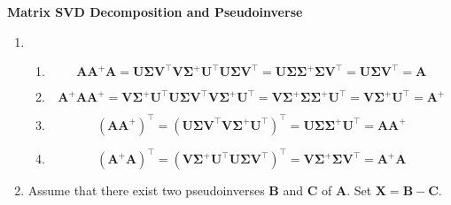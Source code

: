 \documentclass[11pt,letter,notitlepage]{article}
\theoremstyle{definition}
\begin{document}
\newpage

\begin{solution}\textbf{Matrix SVD Decomposition and Pseudoinverse}
	\begin{enumerate}
	\item 
	\begin{enumerate}
		\item 
		\[
		\mathbf{A}\mathbf{A}^{+}\mathbf{A}
		=
		\mathbf{U}\boldsymbol{\Sigma} \mathbf{V}^{\top} \mathbf{V}\boldsymbol{\Sigma}^{+} \mathbf{U}^{\top} \mathbf{U}\boldsymbol{\Sigma} \mathbf{V}^{\top}
		=
		\mathbf{U}\boldsymbol{\Sigma} \boldsymbol{\Sigma}^{+} \boldsymbol{\Sigma} \mathbf{V}^{\top}
		=
		\mathbf{U}\boldsymbol{\Sigma} \mathbf{V}^{\top}
		=
		\mathbf{A}
		\]
		\item 
		\[
		\mathbf{A}^{+}\mathbf{A}\mathbf{A}^{+}
		=
		\mathbf{V}\boldsymbol{\Sigma}^{+} \mathbf{U}^{\top} \mathbf{U}\boldsymbol{\Sigma} \mathbf{V}^{\top} \mathbf{V}\boldsymbol{\Sigma}^{+} \mathbf{U}^{\top}
		=
		\mathbf{V}\boldsymbol{\Sigma}^{+} \boldsymbol{\Sigma} \boldsymbol{\Sigma}^{+} \mathbf{U}^{\top}
		=
		\mathbf{V}\boldsymbol{\Sigma}^{+} \mathbf{U}^{\top}
		=
		\mathbf{A}^{+}
		\]
		\item 
		\[
		(\mathbf{A}\mathbf{A}^{+})^{\top}
		=
		(\mathbf{U}\boldsymbol{\Sigma} \mathbf{V}^{\top} \mathbf{V}\boldsymbol{\Sigma}^{+} \mathbf{U}^{\top})^{\top}
		=
		\mathbf{U}\boldsymbol{\Sigma} \boldsymbol{\Sigma}^{+} \mathbf{U}^{\top}
		=
		\mathbf{A}\mathbf{A}^{+}
		\]
		\item
		\[
		(\mathbf{A}^{+}\mathbf{A})^{\top}
		=
		(\mathbf{V}\boldsymbol{\Sigma}^{+} \mathbf{U}^{\top} \mathbf{U}\boldsymbol{\Sigma} \mathbf{V}^{\top})^{\top}
		=
		\mathbf{V}\boldsymbol{\Sigma}^{+} \boldsymbol{\Sigma} \mathbf{V}^{\top}
		=
		\mathbf{A}^{+}\mathbf{A}
		\]
	\end{enumerate}
	\item 
	Assume that there exist two pseudoinverses $\mathbf{B}$ and $\mathbf{C}$ of $\mathbf{A}$. Set $\mathbf{X} = \mathbf{B} - \mathbf{C}$.


\end{enumerate}
\end{solution}
\end{document}

